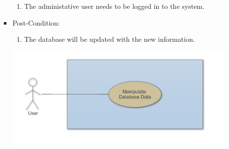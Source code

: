\documentclass[a4paper,10pt]{article}
\begin{document}
\begin{enumerate}
\begin{itemize}
\begin{itemize}
						\begin{enumerate}	
							\item The administative user needs to be logged in to the system. 
						\end{enumerate}
					\item Post-Condition:
						\begin{enumerate}
							\item The database will be updated with the new information. 
						\end{enumerate}
			 \includegraphics[scale=0.62]{Diagrams/ManipulateDatabaseUseCase.png}\\


\end{itemize}
\end{itemize}
\end{enumerate}
\end{document}
